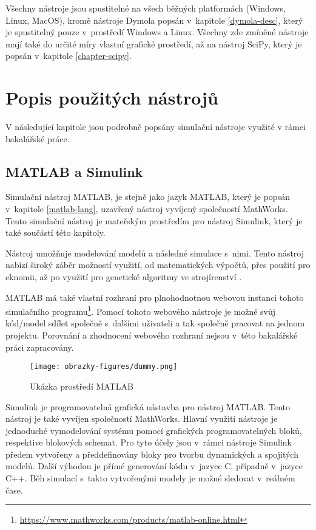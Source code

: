 Všechny nástroje jsou spustitelné na všech běžných platformách (Windows, Linux, MacOS), kromě nástroje Dymola popsán v~kapitole \ref{dymola-desc}, který je spustitelný pouze v~prostředí Windows a Linux. Všechny zde zmíněné nástroje mají také do určité míry vlastní grafické prostředí, až na nástroj SciPy, který je popsán v~kapitole \ref{chapter-scipy}.

\section{Popis použitých nástrojů}
\label{popis-nastroju}
V následující kapitole jsou podrobně popsány simulační nástroje využité v rámci bakalářské práce.
\subsection{MATLAB a Simulink}
\label{matlab-desc}

Simulační nástroj MATLAB, je stejně jako jazyk MATLAB, který je popsán v~kapitole \ref{matlab-lang}, uzavřený nástroj vyvíjený společností MathWorks. Tento simulační nástroj je mateřským prostředím pro nástroj Simulink, který je také součástí této kapitoly.

Nástroj umožňuje modelování modelů a následné simulace s~nimi. Tento nástroj nabízí široký záběr možností využití, od matematických výpočtů, přes použití pro eknomii, až po využití pro genetické algoritmy ve strojírenství \cite{Zapletal2016}.

MATLAB má také vlastní rozhraní pro plnohodnotnou webovou instanci tohoto simulačního programu\footnote{\url{https://www.mathworks.com/products/matlab-online.html}}. Pomocí tohoto webového nástroje je možné svůj kód/model sdílet společně s~dalšími uživateli a tak společně pracovat na jednom projektu. Porovnání a zhodnocení webového rozhraní nejsou v~této bakalářské práci zapracovány.

\begin{figure}
    \centering
    \texttt{[image: obrazky-figures/dummy.png]}
    \caption{Ukázka prostředí MATLAB}
    \label{fig:matlab}
\end{figure}

Simulink je programovatelná grafická nástavba pro nástroj MATLAB. Tento nástroj je také vyvíjen společností MathWorks. Hlavní využití nástroje je jednoduché vymodelování systému pomocí grafických programovatelných bloků, respektive blokových schemat. Pro tyto účely jsou v~rámci nástroje Simulink předem vytvořeny a předdefinovány bloky pro tvorbu dynamických a spojitých modelů. Další výhodou je přímé generování kódu v~jazyce C, případně v~jazyce C++. Běh simulací s~takto vytvořenými modely je možné sledovat v~reálném čase.

